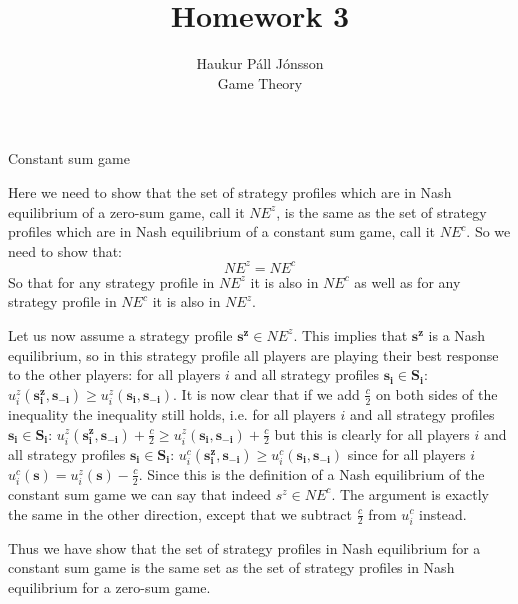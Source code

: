 \documentclass[12pt]{article}
\newenvironment{question}[2][Question]{\begin{trivlist}
\item[\hskip \labelsep {\bfseries #1}\hskip \labelsep {\bfseries #2.}]}{\end{trivlist}}
\newenvironment{answer}[2][Answer]{\begin{trivlist}
\item[\hskip \labelsep {\bfseries #1}\hskip \labelsep {\bfseries #2:}]}{\end{trivlist}}
\begin{document}
\let\oldsum\sum
\renewcommand{\sum}[3]{\oldsum\limits_{#1}^{#2}#3}

\title{Homework 3}
\author{Haukur Páll Jónsson\\
Game Theory}

\maketitle

\begin{question}{1}
Constant sum game
\end{question}
\begin{answer}{a)}
Here we need to show that the set of strategy profiles which are in Nash equilibrium of a zero-sum game, call it $NE^z$, is the same as the set of strategy profiles which are in Nash equilibrium of a constant sum game, call it $NE^c$. So we need to show that:
$$NE^z=NE^c$$
So that for any strategy profile in $NE^z$ it is also in $NE^c$ as well as for any strategy profile in $NE^c$ it is also in $NE^z$.

Let us now assume a strategy profile $\boldsymbol{s^z} \in NE^z$. This implies that $\boldsymbol{s^z}$ is a Nash equilibrium, so in this strategy profile all players are playing their best response to the other players: for all players $i$ and all strategy profiles $\boldsymbol{s_i} \in \boldsymbol{S_i}$: $u^z_i(\boldsymbol{s^z_i}, \boldsymbol{s_{-i}}) \geq u^z_i(\boldsymbol{s_i}, \boldsymbol{s_{-i}})$. It is now clear that if we add $\frac{c}{2}$ on both sides of the inequality the inequality still holds, i.e. for all players $i$ and all strategy profiles $\boldsymbol{s_i} \in \boldsymbol{S_i}$: $u^z_i(\boldsymbol{s^z_i}, \boldsymbol{s_{-i}}) + \frac{c}{2} \geq u^z_i(\boldsymbol{s_i}, \boldsymbol{s_{-i}}) + \frac{c}{2}$ but this is clearly for all players $i$ and all strategy profiles $\boldsymbol{s_i} \in \boldsymbol{S_i}$: $u^c_i(\boldsymbol{s^z_i}, \boldsymbol{s_{-i}}) \geq u^c_i(\boldsymbol{s_i}, \boldsymbol{s_{-i}})$ since for all players $i$ $u^c_i(\boldsymbol{s})=u^z_i(\boldsymbol{s}) - \frac{c}{2}$. Since this is the definition of a Nash equilibrium of the constant sum game we can say that indeed $s^z \in NE^c$. The argument is exactly the same in the other direction, except that we subtract $\frac{c}{2}$ from $u^c_i$ instead.

Thus we have show that the set of strategy profiles in Nash equilibrium for a constant sum game is the same set as the set of strategy profiles in Nash equilibrium for a zero-sum game.
\end{answer}
\end{document}
